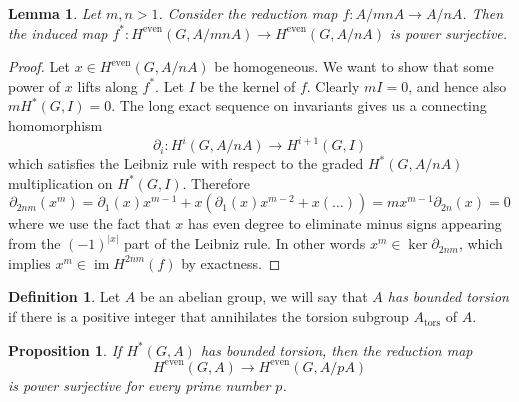 \documentclass{article}
\theoremstyle{plain}
\newtheorem{Lemma}[Th]{Lemma}
\newtheorem{Prop}[Th]{Proposition}
\theoremstyle{definition}
\newtheorem{Def}[Th]{Definition}
\DeclareMathOperator{\im}{im}
\DeclareMathOperator{\even}{even}
\DeclareMathOperator{\tors}{tors}
\begin{document}
\begin{Lemma}\label{lemma:reduction-mn}
    Let $m, n>1$. Consider the reduction  map $f\colon  A/mnA\to A/nA$. Then the induced map  $f^\ast\colon H^{\even}(G, A/mnA) \to H^{\even}(G, A/nA)$ is power surjective.
\end{Lemma}

\begin{proof}
    Let $x\in H^{\even}(G, A/nA)$ be homogeneous. We want to show that some power of $x$ lifts along $f^\ast$. Let $I$ be the kernel of $f$.  Clearly $mI=0$, and hence also $mH^*(G, I)=0$. The long exact sequence on invariants gives us a connecting homomorphism 
    \[
    \partial_i :H^i(G, A/nA)\to H^{i+1}(G, I)
    \]
    which satisfies the Leibniz rule with respect to the graded $H^*(G, A/nA)$ multiplication on $H^*(G, I)$. Therefore 
    \[
    \partial_{2nm}(x^m)=\partial_1(x)x^{m-1}+x(\partial_1(x)x^{m-2}+x(\dots))=mx^{m-1}\partial_{2n}(x)=0
    \]
    where we use the fact that $x$ has even degree to eliminate minus signs appearing from the $(-1)^{|x|}$ part of the Leibniz rule. In other words $x^m\in \ker \partial_{2nm}$, which implies $x^m\in \im H^{2nm}(f)$ by exactness.
\end{proof}

\begin{Def}
    Let $A$ be an abelian group, we will say that \textit{$A$ has bounded torsion} if there is a positive integer that annihilates the torsion subgroup $A_{\tors}$ of $A$.
\end{Def}

\begin{Prop}\label{Prop: power surjectivity on cohomology at a prime}
    If $H^*(G, A)$ has bounded torsion, then the reduction map 
    \[
    H^{\even}(G, A) \to H^{\even}(G, A/pA)
    \]
    is power surjective for every prime number $p$.
\end{Prop}
\end{document}
